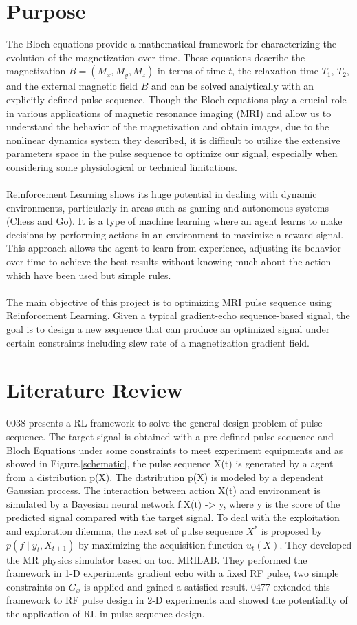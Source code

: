 \section{Purpose}
The Bloch equations provide a mathematical framework for characterizing the evolution of the magnetization over time. These equations describe the magnetization $B=(M_x, M_y, M_z)$ in terms of time $t$, the relaxation time $T_1$, $T_2$, and the external magnetic field $B$ and can be solved analytically with an explicitly defined pulse sequence. Though the Bloch equations play a crucial role in various applications of magnetic resonance imaging (MRI) and allow us to understand the behavior of the magnetization and obtain images, due to the nonlinear dynamics system they described, it is difficult to utilize the extensive parameters space in the pulse sequence to optimize our signal, especially when considering some physiological or technical limitations.
\\\\
Reinforcement Learning shows its huge potential in dealing with dynamic environments, particularly in areas such as gaming and autonomous systems (Chess and Go). It is a type of machine learning where an agent learns to make decisions by performing actions in an environment to maximize a reward signal. This approach allows the agent to learn from experience, adjusting its behavior over time to achieve the best results without knowing much about the action which have been used but simple rules.
\\\\
The main objective of this project is to optimizing MRI pulse sequence using Reinforcement Learning. Given a typical gradient-echo sequence-based signal, the goal is to design a new sequence that can produce an optimized signal under certain constraints including slew rate of a magnetization gradient field.

\section{Literature Review}

0038 presents a RL framework to solve the general design problem of pulse sequence. The target signal is obtained with a pre-defined pulse sequence and Bloch Equations under some constraints to meet experiment equipments and as showed in Figure.\ref{schematic}, the pulse sequence X(t) is generated by a agent from a distribution p(X). The distribution p(X) is modeled by a dependent Gaussian process. The interaction between action X(t) and environment is simulated by a Bayesian neural network f:X(t) -> y, where y is the score of the predicted signal compared with the target signal. To deal with the exploitation and exploration dilemma, the next set of pulse sequence $X^*$ is proposed by $p\left(f \mid y_t, X_{t+1}\right)$ by maximizing the acquisition function $u_t(X)$. They developed the MR physics simulator based on tool MRILAB. They performed the framework in 1-D experiments gradient echo with a fixed RF pulse, two simple constraints on $G_x$ is applied and gained a satisfied result. 0477 extended this framework to RF pulse design in 2-D experiments and showed the potentiality of the application of RL in pulse sequence design.

